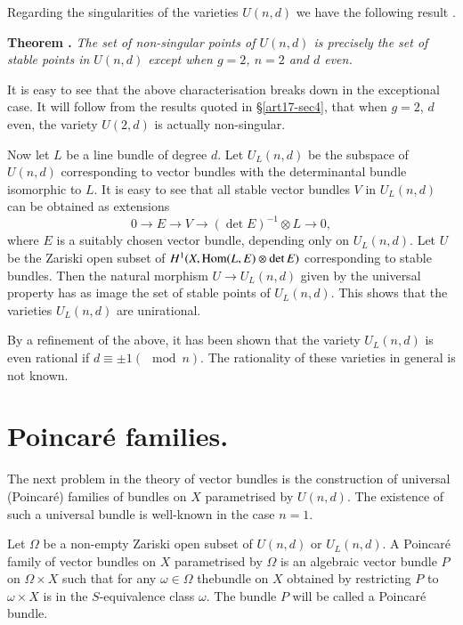 Regarding the singularities of the varieties $U(n,d)$ we have the following result \cite{art17-key3}.

\medskip
\noindent
{\bf Theorem .\label{art17-thm2.1}}
{\em The set of non-singular points of $U(n,d)$ is precisely the set of stable points in $U(n,d)$ except when $g=2$, $n=2$ and $d$ even.}
\smallskip

It is easy to see that the above characterisation breaks down in the exceptional case. It will follow from the results quoted in \S\ref{art17-sec4}, that when $g=2$, $d$ even, the variety $U(2,d)$ is actually non-singular.

Now let $L$ be a line bundle of degree $d$. Let $U_{L}(n,d)$ be the subspace of $U(n,d)$ corresponding to vector bundles with the determinantal bundle isomorphic to $L$. It is easy to see \cite[\S3]{art17-key4} that all stable vector bundles $V$ in $U_{L}(n,d)$ can be obtained as extensions
$$
0\to E\to V\to (\det E)^{-1}\otimes L\to 0,
$$
where $E$ is a suitably chosen vector bundle, depending only on $U_{L}(n,d)$. Let $U$ be the Zariski open subset of $H^{1}(X,\operatorname{\mathrm{Hom}}(L,E)\otimes \det E)$ corresponding to stable bundles. Then the natural morphism $U\to U_{L}(n,d)$ given by the universal property has as image the set of stable points of $U_{L}(n,d)$. This shows that the varieties $U_{L}(n,d)$ are unirational.

By a refinement of the above, it has been shown that the variety $U_{L}(n,d)$ is even rational if $d\equiv \pm 1(\mod n)$. The rationality of these varieties in general is not known.

\section{Poincar\'e families.}\label{art17-sec3}

The next problem in the theory of vector bundles is the construction of universal (Poincar\'e) families of bundles on $X$ parametrised by $U(n,d)$. The existence of such a universal bundle is well-known in the case $n=1$.

\begin{defi*}
Let $\Omega$ be a non-empty Zariski open subset of $U(n,d)$ or $U_{L}(n,d)$. A Poincar\'e family of vector bundles on $X$ parametrised by $\Omega$ is an algebraic vector bundle $P$ on $\Omega\times X$ such that for any $\omega\in \Omega$ the\pageoriginale bundle on $X$ obtained by restricting $P$ to $\omega\times X$ is in the $S$-equivalence class $\omega$. The bundle $P$ will be called a Poincar\'e bundle.
\end{defi*}

